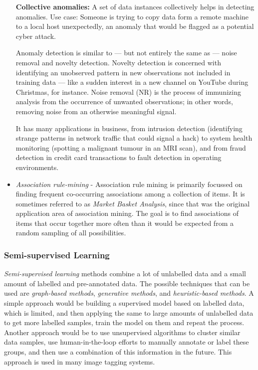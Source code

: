 \documentclass[12pt,a4paper]{article}
\begin{document}
\begin{itemize}
    \textbf{Collective anomalies:} A set of data instances collectively helps in detecting anomalies. Use case: Someone is trying to copy data form a remote machine to a local host unexpectedly, an anomaly that would be flagged as a potential cyber attack.

    Anomaly detection is similar to — but not entirely the same as — noise removal and novelty detection. Novelty detection is concerned with identifying an unobserved pattern in new observations not included in training data — like a sudden interest in a new channel on YouTube during Christmas, for instance. Noise removal (NR) is the process of immunizing analysis from the occurrence of unwanted observations; in other words, removing noise from an otherwise meaningful signal.

    It has many applications in business, from intrusion detection (identifying strange patterns in network traffic that could signal a hack) to system health monitoring (spotting a malignant tumour in an MRI scan), and from fraud detection in credit card transactions to fault detection in operating environments.
    \item \textit{Association rule-mining} - Association rule mining is primarily focussed on finding frequent co-occurring associations among a collection of items. It is sometimes referred to as \textit{Market Basket Analysis}, since that was the original application area of association mining. The goal is to find associations of items that occur together more often than it would be expected from a random sampling of all possibilities.
\end{itemize}

\subsubsection{Semi-supervised Learning}
\textit{Semi-supervised learning} methods combine a lot of unlabelled data and a small amount of labelled and pre-annotated data. The possible techniques that can be used are \textit{graph-based methods}, \textit{generative methods}, and \textit{heuristic-based methods}.
A simple approach would be building a supervised model based on labelled data, which is limited, and
then applying the same to large amounts of unlabelled data to get more labelled samples, train the model on them and repeat the process. Another approach would be to use unsupervised algorithms to cluster similar data samples, use human-in-the-loop efforts to manually annotate or label these groups, and then use a combination of this information in the future. This approach is used in many image tagging systems.
\end{document}
